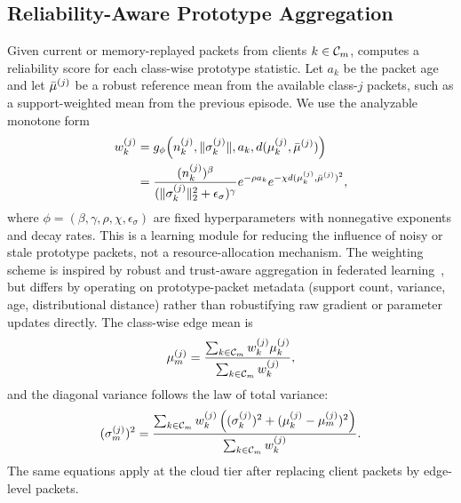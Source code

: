\subsection{Reliability-Aware Prototype Aggregation}
Given current or memory-replayed packets from clients $k\in\mathcal{C}_{m}$, \ehsfp computes a reliability score for each class-wise prototype statistic. Let $a_k$ be the packet age and let $\bar{\mu}^{(j)}$ be a robust reference mean from the available class-$j$ packets, such as a support-weighted mean from the previous episode. We use the analyzable monotone form
\begin{equation}
    \begin{split}
    w_k^{(j)}
    &=
    g_{\phi}\!\left(n_k^{(j)},\|\sigma_k^{(j)}\|,a_k,
    d(\mu_k^{(j)},\bar{\mu}^{(j)})\right)
    \\
    &=
    \frac{(n_k^{(j)})^{\beta}}
    {(\|\sigma_k^{(j)}\|_2^2+\epsilon_{\sigma})^{\gamma}}
    e^{-\rho a_k}
    e^{-\chi d(\mu_k^{(j)},\bar{\mu}^{(j)})^2},
    \end{split}
    \label{eq:reliability_weight}
\end{equation}
where $\phi=(\beta,\gamma,\rho,\chi,\epsilon_{\sigma})$ are fixed hyperparameters with nonnegative exponents and decay rates. This is a learning module for reducing the influence of noisy or stale prototype packets, not a resource-allocation mechanism. The weighting scheme is inspired by robust and trust-aware aggregation in federated learning~\cite{blanchard2017krum,cao2021fltrust}, but differs by operating on prototype-packet metadata (support count, variance, age, distributional distance) rather than robustifying raw gradient or parameter updates directly. The class-wise edge mean is
\begin{equation}
    \mu_{m}^{(j)}
    =
    \frac{\sum_{k\in\mathcal{C}_{m}}w_k^{(j)}\mu_k^{(j)}}
    {\sum_{k\in\mathcal{C}_{m}}w_k^{(j)}},
    \label{eq:agg_mean}
\end{equation}
and the diagonal variance follows the law of total variance:
\begin{equation}
    (\sigma_{m}^{(j)})^2
    =
    \frac{\sum_{k\in\mathcal{C}_{m}}w_k^{(j)}
    \left((\sigma_k^{(j)})^2+
    (\mu_k^{(j)}-\mu_{m}^{(j)})^2\right)}
    {\sum_{k\in\mathcal{C}_{m}}w_k^{(j)}}.
    \label{eq:agg_var}
\end{equation}
The same equations apply at the cloud tier after replacing client packets by edge-level packets.

